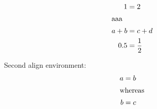 \documentclass{article}
\begin{document}
\begin{align}
1 &=2\\
\intertext{aaa}
a+b&=c+d\\
0.5&=\frac{1}{2}
\end{align}

Second align environment:
\begin{align*}
a&=b\\
\intertext{whereas}
b&=c
\end{align*}
\end{document}
